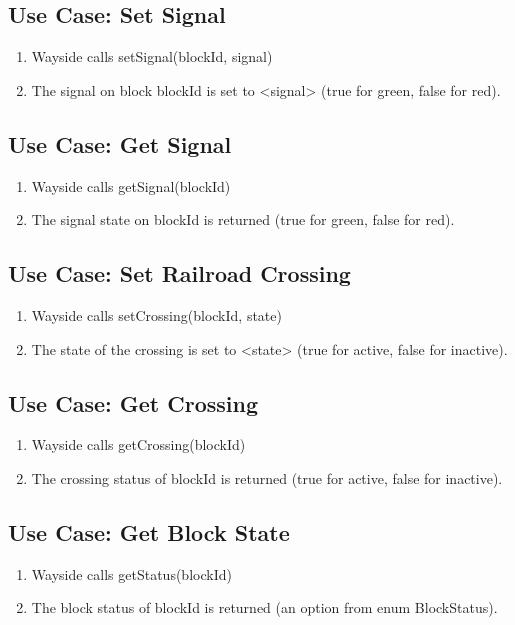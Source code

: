 \documentclass{scrreprt}
\begin{document}
\subsection{Use Case: Set Signal}
\begin{enumerate}
	\item Wayside calls setSignal(blockId, signal)
	\item The signal on block blockId is set to <signal> (true for green, false for red).
\end{enumerate}

\subsection{Use Case: Get Signal}
\begin{enumerate}
	\item Wayside calls getSignal(blockId)
	\item The signal state on blockId is returned (true for green, false for red).
\end{enumerate}

\subsection{Use Case: Set Railroad Crossing}
\begin{enumerate}
	\item Wayside calls setCrossing(blockId, state)
	\item The state of the crossing is set to <state> (true for active, false for inactive).
\end{enumerate}

\subsection{Use Case: Get Crossing}
\begin{enumerate}
	\item Wayside calls getCrossing(blockId)
	\item The crossing status of blockId is returned (true for active, false for inactive).
\end{enumerate}

\subsection{Use Case: Get Block State}
\begin{enumerate}
	\item Wayside calls getStatus(blockId)
	\item The block status of blockId is returned (an option from enum BlockStatus).
\end{enumerate}
\end{document}
